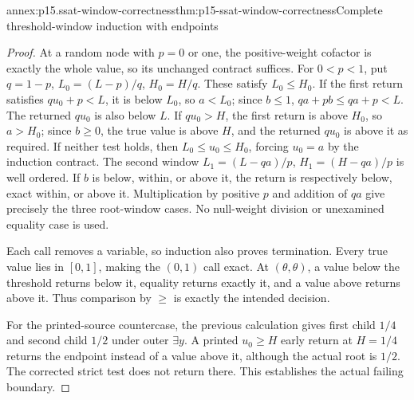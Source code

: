 \begin{annexitem}{annex:p15.ssat-window-correctness}{thm:p15-ssat-window-correctness}{Complete threshold-window induction with endpoints}
\begin{proof}
At a random node with \(p=0\) or one, the positive-weight cofactor
is exactly the whole value, so its unchanged contract suffices. For
\(0<p<1\), put \(q=1-p\),
\(L_0=(L-p)/q\), \(H_0=H/q\). These satisfy \(L_0\leq H_0\).
If the first return satisfies \(qu_0+p<L\), it is below
\(L_0\), so \(a<L_0\); since \(b\leq1\),
\(qa+pb\leq qa+p<L\). The returned \(qu_0\) is also
below \(L\). If \(qu_0>H\), the first return is above
\(H_0\), so \(a>H_0\); since \(b\geq0\), the true
value is above \(H\), and the returned \(qu_0\) is above
it as required. If neither test holds, then
\(L_0\leq u_0\leq H_0\), forcing \(u_0=a\) by the
induction contract. The second window
\(L_1=(L-qa)/p\), \(H_1=(H-qa)/p\) is well ordered.
If \(b\) is below, within, or above it, the return is respectively
below, exact within, or above it. Multiplication by positive \(p\)
and addition of \(qa\) give precisely the three root-window
cases. No null-weight division or unexamined equality case is used.

Each call removes a variable, so induction also proves termination.
Every true value lies in \([0,1]\), making the \((0,1)\) call
exact. At \((\theta,\theta)\), a value below the threshold returns
below it, equality returns exactly it, and a value above returns above
it. Thus comparison by \(\geq\) is exactly the intended decision.

For the printed-source countercase, the previous calculation gives
first child \(1/4\) and second child \(1/2\) under outer
\(\exists y\). A printed \(u_0\geq H\) early return at
\(H=1/4\) returns the endpoint instead of a value above it,
although the actual root is \(1/2\). The corrected strict test
does not return there. This establishes the actual failing boundary.
\end{proof}
\end{annexitem}

